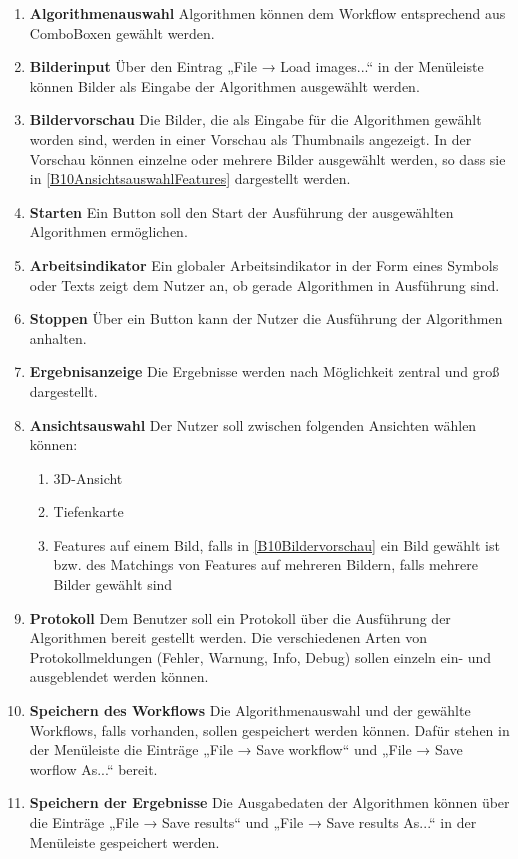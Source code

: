 \begin{enumerate}[ align=left, label={\textbf{\textbackslash B10\arabic*0\textbackslash}} ]
	\item \textbf{Algorithmenauswahl} Algorithmen können dem Workflow entsprechend aus ComboBoxen gewählt werden.
	\item \textbf{Bilderinput} Über den Eintrag „File → Load images...“ in der Menüleiste können Bilder als Eingabe der Algorithmen ausgewählt werden.
	\item \textbf{Bildervorschau} \label{B10Bildervorschau} Die Bilder, die als Eingabe für die Algorithmen gewählt worden sind, werden in einer Vorschau als Thumbnails angezeigt. In der Vorschau können einzelne oder mehrere Bilder ausgewählt werden, so dass sie in \ref{B10AnsichtsauswahlFeatures} dargestellt werden.
	\item \textbf{Starten} \label{B10Starten} Ein Button soll den Start der Ausführung der ausgewählten Algorithmen ermöglichen.
	\item \textbf{Arbeitsindikator} \label{B10Arbeitsindikator} Ein globaler Arbeitsindikator in der Form eines Symbols oder Texts zeigt dem Nutzer an, ob gerade Algorithmen in Ausführung sind.
	\item \textbf{Stoppen} Über ein Button kann der Nutzer die Ausführung der Algorithmen anhalten.
	\item \textbf{Ergebnisanzeige} Die Ergebnisse werden nach Möglichkeit zentral und groß dargestellt.
	\item \textbf{Ansichtsauswahl} Der Nutzer soll zwischen folgenden Ansichten wählen können:
		\begin{enumerate}[ label={\textbf{\alph*}}, ref={\textbf{\textbackslash B10\arabic{enumi}0\textbackslash\alph*}} ]
			\item 3D-Ansicht
			\item Tiefenkarte
			\item \label{B10AnsichtsauswahlFeatures} Features auf einem Bild, falls in \ref{B10Bildervorschau} ein Bild gewählt ist bzw. des Matchings von Features auf mehreren Bildern, falls mehrere Bilder gewählt sind
		\end{enumerate}
	\item \textbf{Protokoll} Dem Benutzer soll ein Protokoll über die Ausführung der Algorithmen bereit gestellt werden. Die verschiedenen Arten von Protokollmeldungen (Fehler, Warnung, Info, Debug) sollen einzeln ein- und ausgeblendet werden können.
	\item \textbf{Speichern des Workflows} Die Algorithmenauswahl und der gewählte Workflows, falls vorhanden, sollen gespeichert werden können. Dafür stehen in der Menüleiste die Einträge „File → Save workflow“ und „File → Save worflow As...“ bereit.
	\item \textbf{Speichern der Ergebnisse} Die Ausgabedaten der Algorithmen können über die Einträge „File → Save results“ und „File → Save results As...“ in der Menüleiste gespeichert werden.
\end{enumerate}

